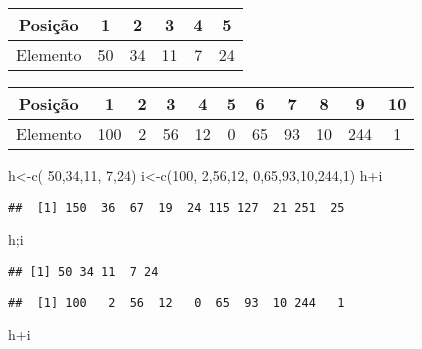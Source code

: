 \documentclass[
]{book}
\newenvironment{Shaded}{\begin{snugshade}}{\end{snugshade}}
\newcommand{\DecValTok}[1]{\textcolor[rgb]{0.00,0.00,0.81}{#1}}
\newcommand{\FunctionTok}[1]{\textcolor[rgb]{0.00,0.00,0.00}{#1}}
\newcommand{\NormalTok}[1]{#1}
\newcommand{\OtherTok}[1]{\textcolor[rgb]{0.56,0.35,0.01}{#1}}
\newcommand{\SpecialCharTok}[1]{\textcolor[rgb]{0.00,0.00,0.00}{#1}}
\begin{document}
\begin{longtable}[]{@{}cccccc@{}}
\toprule
Posição & 1 & 2 & 3 & 4 & 5 \\
\midrule
\endhead
Elemento & 50 & 34 & 11 & 7 & 24 \\
\bottomrule
\end{longtable}

\begin{longtable}[]{@{}ccccccccccc@{}}
\toprule
Posição & 1 & 2 & 3 & 4 & 5 & 6 & 7 & 8 & 9 & 10 \\
\midrule
\endhead
Elemento & 100 & 2 & 56 & 12 & 0 & 65 & 93 & 10 & 244 & 1 \\
\bottomrule
\end{longtable}

\begin{Shaded}
\begin{Highlighting}[]
\NormalTok{h}\OtherTok{\textless{}{-}}\FunctionTok{c}\NormalTok{( }\DecValTok{50}\NormalTok{,}\DecValTok{34}\NormalTok{,}\DecValTok{11}\NormalTok{, }\DecValTok{7}\NormalTok{,}\DecValTok{24}\NormalTok{)}
\NormalTok{i}\OtherTok{\textless{}{-}}\FunctionTok{c}\NormalTok{(}\DecValTok{100}\NormalTok{, }\DecValTok{2}\NormalTok{,}\DecValTok{56}\NormalTok{,}\DecValTok{12}\NormalTok{, }\DecValTok{0}\NormalTok{,}\DecValTok{65}\NormalTok{,}\DecValTok{93}\NormalTok{,}\DecValTok{10}\NormalTok{,}\DecValTok{244}\NormalTok{,}\DecValTok{1}\NormalTok{)}
\NormalTok{h}\SpecialCharTok{+}\NormalTok{i}
\end{Highlighting}
\end{Shaded}

\begin{verbatim}
##  [1] 150  36  67  19  24 115 127  21 251  25
\end{verbatim}

\begin{Shaded}
\begin{Highlighting}[]
\NormalTok{h;i}
\end{Highlighting}
\end{Shaded}

\begin{verbatim}
## [1] 50 34 11  7 24
\end{verbatim}

\begin{verbatim}
##  [1] 100   2  56  12   0  65  93  10 244   1
\end{verbatim}

\begin{Shaded}
\begin{Highlighting}[]
\NormalTok{h}\SpecialCharTok{+}\NormalTok{i}
\end{Highlighting}
\end{Shaded}
\end{document}
